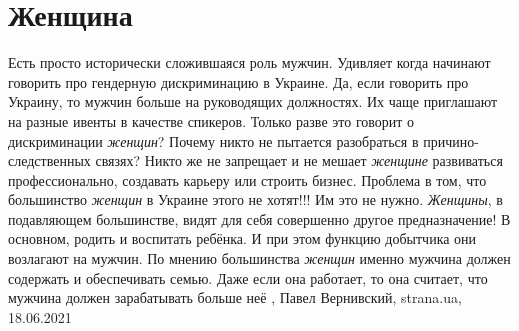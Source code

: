  
 
 
 
 
\chapter{Женщина}

Есть просто исторически сложившаяся роль мужчин.  Удивляет когда начинают
говорить про гендерную дискриминацию в Украине.  Да, если говорить про Украину,
то мужчин больше на руководящих должностях. Их чаще приглашают на разные ивенты
в качестве спикеров.  Только разве это говорит о дискриминации \emph{женщин}?
Почему никто не пытается разобраться в причино-следственных связях?  Никто же
не запрещает и не мешает \emph{женщине} развиваться профессионально, создавать
карьеру или строить бизнес.  Проблема в том, что большинство \emph{женщин} в
Украине этого не хотят!!! Им это не нужно. \emph{Женщины}, в подавляющем
большинстве, видят для себя совершенно другое предназначение! В основном,
родить и воспитать ребёнка.  И при этом функцию добытчика они возлагают на
мужчин. По мнению большинства \emph{женщин} именно мужчина должен содержать и
обеспечивать семью. Даже если она работает, то она считает, что мужчина должен
зарабатывать больше неё
, 
Павел Вернивский, strana.ua, 18.06.2021

